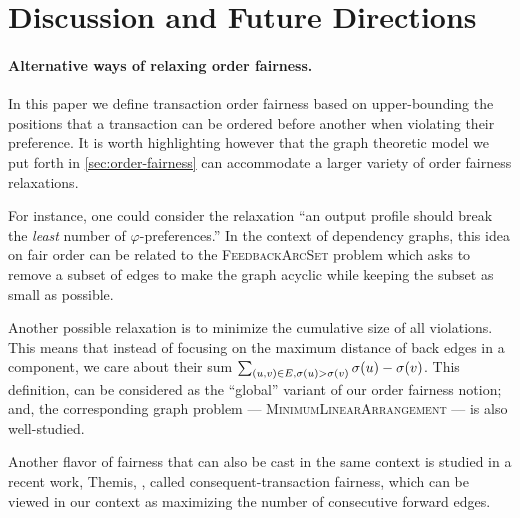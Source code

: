 \section{Discussion and Future Directions}
\label{sec:discussions}

\paragraph{Alternative ways of relaxing order fairness.}
%
In this paper we define transaction order fairness based on upper-bounding the positions that a transaction can be ordered before another when violating their preference.
%
It is worth highlighting however that the graph theoretic model we put forth in \cref{sec:order-fairness} can accommodate a larger variety of order fairness relaxations.

For instance, one could consider the relaxation ``an output profile \orderOutput should break the \emph{least} number of $\varphi$-preferences.''
%
In the context of dependency graphs, this idea on fair order can be related to the \textsc{FeedbackArcSet} problem \cite{TOCS:BFKKT12} which asks to remove a subset of edges to make the graph acyclic while keeping the subset as small as possible.

Another possible relaxation is to minimize the cumulative size of all violations.
%
This means that instead of focusing on the maximum distance of back edges in a component, we care about their sum $\sum_{(u, v)\in E,  \sigma(u) > \sigma(v)} \allowbreak \sigma(u) - \sigma(v)$.
%
This definition, can be considered as the ``global'' variant of our order fairness notion; and, the corresponding graph problem --- \textsc{MinimumLinearArrangement} \cite{TOCS:BFKKT12} --- is also well-studied.

Another flavor of fairness that can also be cast in the same context is studied in a recent work, \textsf{Themis}, \cite{CCS:KDLJK23}, called consequent-transaction fairness, which can be viewed in our context as maximizing the number of consecutive forward edges.

